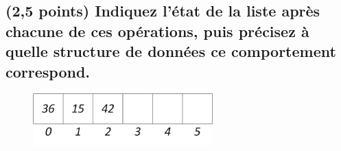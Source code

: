 \documentclass[11pt,a4paper]{article}
\begin{document}
\bigskip

\vfillLast

\newpage

\subsection{(2,5 points) Indiquez l'état de la liste après chacune de ces opérations, puis précisez à quelle structure de données ce comportement correspond. }


\begin{figure}[ht!]
\centering
\centerline{  %
\includegraphics[height=2cm]{img/Liste_t_1.png}
}
\end{figure}
\end{document}
